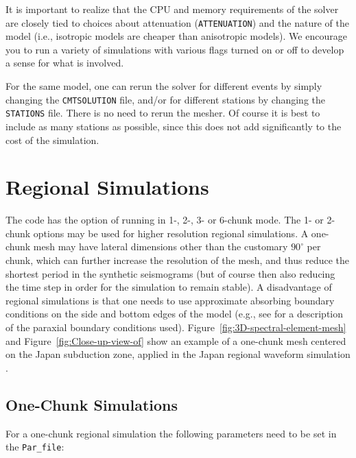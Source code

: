 \documentclass[oneside,english]{book}
\begin{document}
It is important to realize that the CPU and memory requirements of
the solver are closely tied to choices about attenuation (\texttt{ATTENUATION})
and the nature of the model (i.e., isotropic models are cheaper than
anisotropic models). We encourage you to run a variety of simulations
with various flags turned on or off to develop a sense for what is
involved.

For the same model, one can rerun the solver for different events
by simply changing the \texttt{CMTSOLUTION} file, and/or for different
stations by changing the \texttt{STATIONS} file. There is no need
to rerun the mesher. Of course it is best to include as many stations
as possible, since this does not add significantly to the cost of
the simulation.


\chapter{\label{cha:Regional-Simulations}Regional Simulations}

The code has the option of running in 1-, 2-, 3- or 6-chunk mode.
The 1- or 2-chunk options may be used for higher resolution regional
simulations. A one-chunk mesh may have lateral dimensions other than
the customary $90^{\circ}$ per chunk, which can further increase
the resolution of the mesh, and thus reduce the shortest period in
the synthetic seismograms (but of course then also reducing the time
step in order for the simulation to remain stable). A disadvantage
of regional simulations is that one needs to use approximate absorbing
boundary conditions on the side and bottom edges of the model (e.g.,
see \citet{KoTr99} for a description of the paraxial boundary conditions
used). Figure~\vref{fig:3D-spectral-element-mesh} and Figure~\vref{fig:Close-up-view-of}
show an example of a one-chunk mesh centered on the Japan subduction
zone, applied in the Japan regional waveform simulation \citep{ChTrHeKa07}.


\section{One-Chunk Simulations\label{sec:One-Chunk-Simulations}}

For a one-chunk regional simulation the following parameters need
to be set in the \texttt{Par\_file}:
\end{document}
